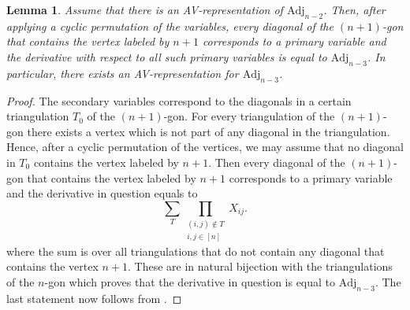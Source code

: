 \documentclass[a4paper,10pt]{amsart}
\theoremstyle{definition}
\theoremstyle{plain}
\newtheorem{lem}[Def]{Lemma}
\begin{document}
\begin{lem}\label{lem:reduceto4}
    Assume that there is an AV-representation of $\mathrm{Adj}_{n-2}$. Then, after applying a cyclic permutation of the variables, every diagonal of the $(n+1)$-gon that contains the vertex labeled by $n+1$ corresponds to a primary variable and the derivative with respect to all such primary variables is equal to $\mathrm{Adj}_{n-3}$. In particular, there exists an AV-representation for $\mathrm{Adj}_{n-3}$.
\end{lem}
\begin{proof}
    The secondary variables correspond to the diagonals in a certain triangulation $T_0
    $ of the $(n+1)$-gon. For every triangulation of the $(n+1)$-gon there exists a vertex which is not part of any diagonal in the triangulation. Hence, after a cyclic permutation of the vertices, we may assume that no diagonal in $T_0$ contains the vertex labeled by $n+1$. Then every diagonal of the $(n+1)$-gon that contains the vertex labeled by $n+1$ corresponds to a primary variable and the derivative in question equals to
    \begin{equation*}
        \sum_{T}\prod_{\substack{(i,j)\not\in T\\ i,j\in[n]}} X_{ij}.
    \end{equation*}
    where the sum is over all triangulations that do not contain any diagonal that contains the vertex $n+1$. These are in natural bijection with the triangulations of the $n$-gon which proves that the derivative in question is equal to $\mathrm{Adj}_{n-3}$. The last statement now follows from .
\end{proof}
\end{document}
